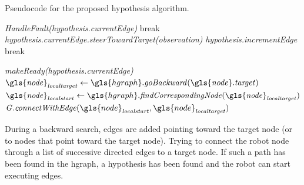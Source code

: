 \noindent
\begin{algorithm}[H]
  \caption{Pseudocode for the proposed hypothesis algorithm.}\label{pseudocode:halgorithm}
  \begin{algorithmic}[1]

    \hspace{-0.9cm}\colorbox{my_grey}{\parbox{\linewidth}{%

        \hspace{-0.1cm}\colorbox{my_yellow}{\parbox{\linewidth}{%

            \hspace{-0.1cm}\colorbox{my_light_blue}{\parbox{\linewidth}{%
                 
                \State \textit{HandleFault(\gls{hypothesis}.currentEdge)}
                \State break
                \EndIf
                \State \textit{\gls{hypothesis}.currentEdge.steerTowardTarget(\gls{observation})}
                  \State \textit{\gls{hypothesis}.incrementEdge}
                \Else
                  \State break
                \EndIf
                \EndIf
                \EndWhile
            }}
            \Else
            \State \textit{makeReady(\gls{hypothesis}.currentEdge)}
            \EndIf
            \Else
            \State $\mathit{\gls{node}_{localtarget}} \leftarrow \gls{hgraph}.\mathit{goBackward(\gls{node}.target)}$
            \State $\mathit{\gls{node}_{localstart}} \leftarrow \gls{hgraph}.\mathit{findCorrespondingNode(\gls{node}_{localtarget})}$
            \State $\mathit{G.connectWithEdge}(\gls{node}_\mathit{localstart}, \gls{node}_\mathit{localtarget})$
            \EndIf
            \EndWhile
        }}
        \EndFor
    }}
  \end{algorithmic}
\end{algorithm}

During a backward search, edges are added pointing toward the target node (or to nodes that point toward the target node). Trying to connect the robot node through a list of successive directed edges to a target node. If such a path has been found in the \ac{hgraph}, a hypothesis has been found and the robot can start executing edges.\bs


